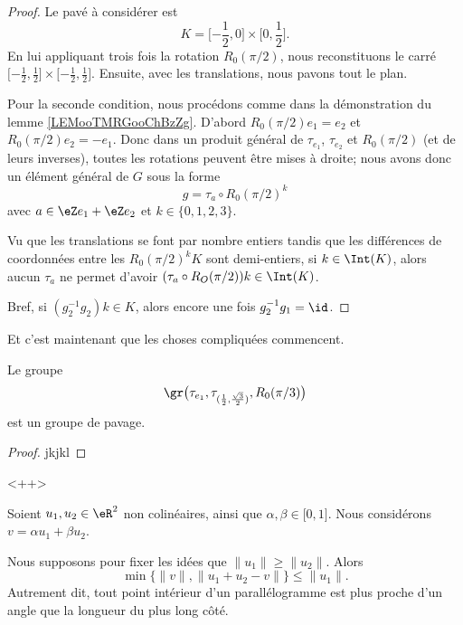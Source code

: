 \begin{proof}
    Le pavé à considérer est
    \begin{equation}
        K=\mathopen[ -\frac{ 1 }{2} , 0 \mathclose]\times \mathopen[ 0 , \frac{ 1 }{2} \mathclose].
    \end{equation}
    En lui appliquant trois fois la rotation \( R_0(\pi/2)\), nous reconstituons le carré \( \mathopen[ -\frac{ 1 }{2} , \frac{ 1 }{2} \mathclose]\times \mathopen[ -\frac{ 1 }{2} , \frac{ 1 }{2} \mathclose]\). Ensuite, avec les translations, nous pavons tout le plan.

    Pour la seconde condition, nous procédons comme dans la démonstration du lemme \ref{LEMooTMRGooChBzZg}. D'abord \( R_0(\pi/2)e_1=e_2\) et \( R_0(\pi/2)e_2=-e_1\). Donc dans un produit général de \( \tau_{e_1}\), \( \tau_{e_2}\) et \( R_0(\pi/2)\) (et de leurs inverses), toutes les rotations peuvent être mises à droite; nous avons donc un élément général de \( G\) sous la forme
    \begin{equation}
        g=\tau_a\circ R_0(\pi/2)^k
    \end{equation}
    avec \( a\in \eZ e_1+\eZ e_2\) et \( k\in \{ 0,1,2,3 \}\).
    
    Vu que les translations se font par nombre entiers tandis que les différences de coordonnées entre les \( R_0(\pi/2)^kK\) sont demi-entiers, si \( k\in \Int(K)\), alors aucun \( \tau_a\) ne permet d'avoir \( (\tau_a\circ R_O(\pi/2))k\in \Int(K)\).

    Bref, si \( (g_2^{-1}g_2)k\in K\), alors encore une fois \( g_2^{-1}g_1=\id\).
\end{proof}

Et c'est maintenant que les choses compliquées commencent.

\begin{lemma}
    Le groupe
    \begin{equation}
        \gr\big( \tau_{e_1},\tau_{(\frac{ 1 }{2},\frac{ \sqrt{ 3 } }{2})},R_0(\pi/3) \big)
    \end{equation}
    est un groupe de pavage.
\end{lemma}

\begin{proof}
    jkjkl
\end{proof}
<++>



\begin{lemma}        \label{LEMooEKWZooYbcGBp}
    Soient \( u_1,u_2\in \eR^2\) non colinéaires, ainsi que \( \alpha,\beta\in \mathopen[ 0 , 1 \mathclose]\). Nous considérons \( v=\alpha u_1+\beta u_2\).

    Nous supposons pour fixer les idées que \( \| u_1 \|\geq \| u_2 \|\). Alors
    \begin{equation}
        \min\{ \| v \|, \| u_1+u_2-v \| \}\leq \| u_1 \|.
    \end{equation}
    Autrement dit, tout point intérieur d'un parallélogramme est plus proche d'un angle que la longueur du plus long côté.
\end{lemma}

